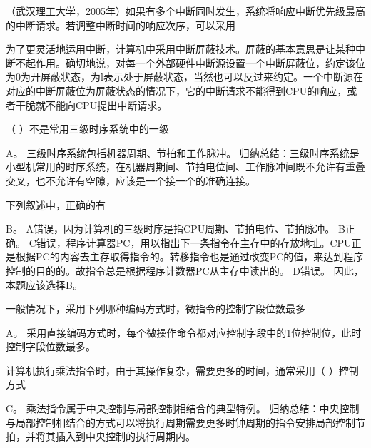 \question （武汉理工大学，2005年）如果有多个中断同时发生，系统将响应中断优先级最高的中断请求。若调整中断时间的响应次序，可以采用
\par{}
\begin{solution}为了更灵活地运用中断，计算机中采用中断屏蔽技术。屏蔽的基本意思是让某种中断不起作用。确切地说，对每一个外部硬件中断源设置一个中断屏蔽位，约定该位为0为开屏蔽状态，为l表示处于屏蔽状态，当然也可以反过来约定。一个中断源在对应的中断屏蔽位为屏蔽状态的情况下，它的中断请求不能得到CPU的响应，或者干脆就不能向CPU提出中断请求。
\end{solution}
\question （ ）不是常用三级时序系统中的一级
\par{}
\begin{solution}A。 三级时序系统包括机器周期、节拍和工作脉冲。
归纳总结：三级时序系统是小型机常用的时序系统，在机器周期间、节拍电位间、工作脉冲间既不允许有重叠交叉，也不允许有空隙，应该是一个接一个的准确连接。
\end{solution}
\question 下列叙述中，正确的有
\par{}
\begin{solution}B。 A错误，因为计算机的三级时序是指CPU周期、节拍电位、节拍脉冲。 B正确。
C错误，程序计算器PC，用以指出下一条指令在主存中的存放地址。CPU正是根据PC的内容去主存取得指令的。转移指令也是通过改变PC的值，来达到程序控制的目的的。故指令总是根据程序计数器PC从主存中读出的。
D错误。 因此，本题应该选择B。
\end{solution}
\question 一般情况下，采用下列哪种编码方式时，微指令的控制字段位数最多
\par{}
\begin{solution}A。
采用直接编码方式时，每个微操作命令都对应控制字段中的1位控制位，此时控制字段位数最多。
\end{solution}
\question 计算机执行乘法指令时，由于其操作复杂，需要更多的时间，通常采用（
）控制方式
\par{}
\begin{solution}C。 乘法指令属于中央控制与局部控制相结合的典型特例。
归纳总结：中央控制与局部控制相结合的方式可以将执行周期需要更多时钟周期的指令安排局部控制节拍，并将其插入到中央控制的执行周期内。
\end{solution}
